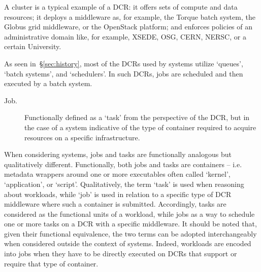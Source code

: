\documentclass{sig-alternate}
\begin{document}

A cluster is a typical example of a DCR: it offers sets of compute and data
resources; it deploys a middleware as, for example, the Torque batch system, the
Globus grid middleware, or the OpenStack platform; and enforces policies of an
administrative domain like, for example, XSEDE, OSG, CERN, NERSC, or a certain
University.

As seen in~\S\ref{sec:history}, most of the DCRs used by \pilotjob systems
utilize `queues', `batch systems', and `schedulers'. In such DCRs, jobs are
scheduled and then executed by a batch system.

\begin{description}

\item[Job.] Functionally defined as a `task' from the perspective of the DCR,
but in the case of a \pilotjob system indicative of the type of container
required to acquire resources on a specific infrastructure.

\end{description}

When considering \pilotjob systems, jobs and tasks are functionally analogous
but qualitatively different. Functionally, both jobs and tasks are containers --
i.e. metadata wrappers around one or more executables often called `kernel',
`application', or `script'. Qualitatively, the term `task' is used when
reasoning about workloads, while `job' is used in relation to a specific type of
DCR middleware where such a container is submitted. Accordingly, tasks are
considered as the functional units of a workload, while jobs as a way to
schedule one or more tasks on a DCR with a specific middleware. It should be
noted that, given their functional equivalence, the two terms can be adopted
interchangeably when considered outside the context of \pilotjob systems.
Indeed, workloads are encoded into jobs when they have to be directly executed
on DCRs that support or require that type of container.

\end{document}
